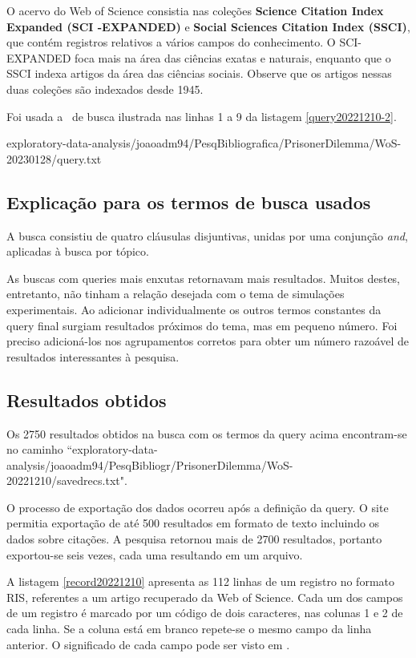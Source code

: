 O acervo do Web of Science consistia nas coleções \textbf{Science  Citation  Index  Expanded (SCI -EXPANDED)} e \textbf{Social  Sciences  Citation  Index (SSCI)}, que contém registros relativos a vários campos do conhecimento. O SCI-EXPANDED foca mais na área das ciências exatas e naturais, enquanto que o SSCI indexa artigos da área das ciências sociais. Observe que os artigos nessas duas coleções são indexados desde 1945. 

Foi usada a \query\  de busca ilustrada nas linhas 1 a 9 da listagem \ref{query20221210-2}.


{exploratory-data-analysis/joaoadm94/PesqBibliografica/PrisonerDilemma/WoS-20230128/query.txt}

\subsection{Explicação para os termos de busca usados}

A busca consistiu de quatro cláusulas disjuntivas, unidas por uma conjunção \textit{and}, aplicadas à busca por tópico.

As buscas com queries mais enxutas retornavam mais resultados. Muitos destes, entretanto, não tinham a relação desejada com o tema de simulações experimentais. Ao adicionar individualmente os outros termos constantes da query final surgiam resultados próximos do tema, mas em pequeno número. Foi preciso adicioná-los nos agrupamentos corretos para obter um número razoável de resultados interessantes à pesquisa.

\subsection{Resultados obtidos}

Os 2750 resultados obtidos na busca com os termos da query acima encontram-se no caminho ``exploratory-data-analysis/joaoadm94/PesqBibliogr/PrisonerDilemma/WoS-20221210/savedrecs.txt".

O processo de exportação dos dados ocorreu após a definição da query. O site permitia exportação de até 500 resultados em formato de texto incluindo os dados sobre citações. A pesquisa retornou mais de 2700 resultados, portanto exportou-se seis vezes, cada uma resultando em um arquivo.

A listagem \ref{record20221210} apresenta as 112 linhas de um registro no formato RIS, referentes a um artigo recuperado da Web of Science. Cada um dos campos de um registro é marcado por um código de dois caracteres, nas colunas 1 e 2 de cada linha. Se a coluna está em branco repete-se o mesmo campo da linha anterior.
O significado de cada campo pode ser visto em \citep{wikipedia_ris_2017}.

